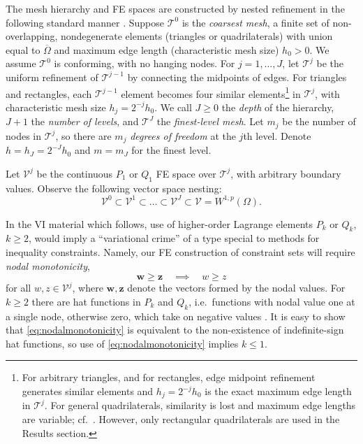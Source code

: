 \documentclass[letterpaper,final,12pt,reqno]{amsart}
\theoremstyle{cstyle}
\theoremstyle{cstyle*}
\theoremstyle{dstyle}
\numberwithin{equation}{section}
\numberwithin{figure}{section}
\numberwithin{table}{section}
\numberwithin{theorem}{section}
\newcommand{\bw}{\mathbf{w}}
\newcommand{\bz}{\mathbf{z}}
\begin{document}
The mesh hierarchy and FE spaces are constructed by nested refinement in the following standard manner \cite{Elmanetal2014}.  Suppose $\mathcal{T}^0$ is the \emph{coarsest mesh}, a finite set of non-overlapping, nondegenerate elements (triangles or quadrilaterals) with union equal to $\overline{\Omega}$ and maximum edge length (characteristic mesh size) $h_0>0$.  We assume $\mathcal{T}^0$ is conforming, with no hanging nodes.  For $j=1,\dots,J$, let $\mathcal{T}^j$ be the uniform refinement of $\mathcal{T}^{j-1}$ by connecting the midpoints of edges.  For triangles and rectangles, each $\mathcal{T}^{j-1}$ element becomes four similar elements\footnote{For arbitrary triangles, and for rectangles, edge midpoint refinement generates similar elements and $h_j=2^{-j}h_0$ is the exact maximum edge length in $\mathcal{T}^j$.  For general quadrilaterals, similarity is lost and maximum edge lengths are variable; cf.~\cite{Zhang2004}.  However, only rectangular quadrilaterals are used in the Results section.} in $\mathcal{T}^j$, with characteristic mesh size $h_j = 2^{-j} h_0$.  We call $J\ge 0$ the \emph{depth} of the hierarchy, $J+1$ the \emph{number of levels}, and $\mathcal{T}^J$ the \emph{finest-level mesh}.  Let $m_j$ be the number of nodes in $\mathcal{T}^j$, so there are $m_j$ \emph{degrees of freedom} at the $j$th level.  Denote $h=h_J=2^{-J} h_0$ and $m=m_J$ for the finest level.

Let $\mathcal{V}^j$ be the continuous $P_1$ or $Q_1$ FE space \cite{Elmanetal2014} over $\mathcal{T}^j$, with arbitrary boundary values.  Observe the following vector space nesting:
\begin{equation}
\mathcal{V}^0 \subset \mathcal{V}^1 \subset \dots \subset \mathcal{V}^J \subset \mathcal{V}=W^{1,p}(\Omega).  \label{eq:fe:nestedspaces}
\end{equation}

In the VI material which follows, use of higher-order Lagrange elements $P_k$ or $Q_k$, $k\ge 2$, would imply a ``variational crime'' \cite[Chapter 10]{BrennerScott2007} of a type special to methods for inequality constraints.  Namely, our FE construction of constraint sets will require \emph{nodal monotonicity},
\begin{equation}
\bw \ge \bz \quad \implies \quad w \ge z \label{eq:nodalmonotonicity}
\end{equation}
for all $w,z \in \mathcal{V}^j$, where $\bw,\bz$ denote the vectors formed by the nodal values.  For $k\ge 2$ there are hat functions in $P_k$ and $Q_k$, i.e.~functions with nodal value one at a single node, otherwise zero, which take on negative values \cite[Figure 1.7]{Elmanetal2014}.  It is easy to show that \eqref{eq:nodalmonotonicity} is equivalent to the non-existence of indefinite-sign hat functions, so use of \eqref{eq:nodalmonotonicity} implies $k\le 1$.
\end{document}
